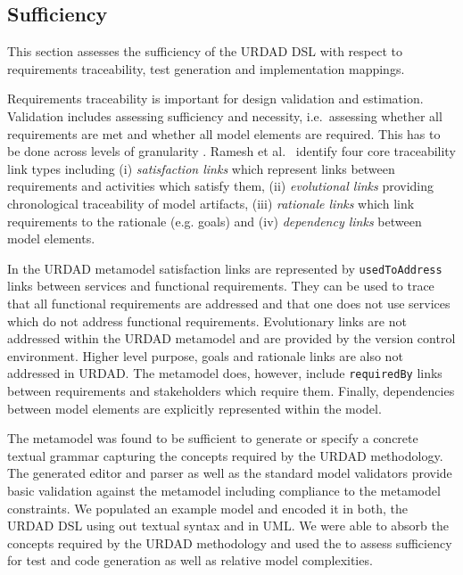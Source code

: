 
\subsection{Sufficiency}

This section assesses the sufficiency of the URDAD DSL with respect to requirements traceability, test generation and implementation mappings. 

Requirements traceability is important for design validation and estimation. Validation includes assessing sufficiency and necessity, i.e.\ assessing whether all requirements are met and whether all model elements are required. This has to be done across levels of granularity \cite{dick_design_2005}. Ramesh et al.\ \cite{ramesh_toward_2001} identify four core traceability link types including (i) \emph{satisfaction links} which represent links between requirements and activities which satisfy them, (ii) \emph{evolutional links} providing chronological traceability of model artifacts, (iii) \emph{rationale links} which link requirements to the rationale (e.g. goals) and (iv) \emph{dependency links} between model elements.

In the URDAD metamodel satisfaction links are represented by \verb+usedToAddress+ links between services and functional requirements. They can be used to trace that all functional requirements are addressed and that one does not use services which do not address functional requirements. Evolutionary links are not addressed within the URDAD metamodel and are provided by the version control environment. Higher level purpose, goals and rationale links are also not addressed in URDAD. The metamodel does, however, include  \verb+requiredBy+ links between requirements and stakeholders which require them. Finally, dependencies between model elements are explicitly represented within the model. 

The metamodel was found to be sufficient to generate or specify a concrete textual grammar capturing the concepts required by the URDAD methodology. The generated editor and parser as well as the standard model validators provide basic validation against the metamodel including compliance to the metamodel constraints. We populated an example model and encoded it in both, the URDAD DSL using out textual syntax and in UML. We were able to absorb the concepts required by the URDAD methodology and used the to assess sufficiency for test and code generation as well as relative model complexities.

